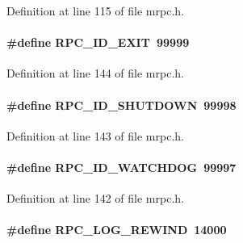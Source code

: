 Definition at line 115 of file mrpc.h.
\paragraph[{RPC\_\-ID\_\-EXIT}]{\setlength{\rightskip}{0pt plus 5cm}\#define RPC\_\-ID\_\-EXIT~99999}\hfill\label{group__mrpcdefineh_ga4fecef60778fda08ca026eaad345eca2}

\begin{DoxyItemize}
\item 
\end{DoxyItemize}

Definition at line 144 of file mrpc.h.
\paragraph[{RPC\_\-ID\_\-SHUTDOWN}]{\setlength{\rightskip}{0pt plus 5cm}\#define RPC\_\-ID\_\-SHUTDOWN~99998}\hfill\label{group__mrpcdefineh_ga758695700ff26f404eec79ecbeab4947}

\begin{DoxyItemize}
\item 
\end{DoxyItemize}

Definition at line 143 of file mrpc.h.
\paragraph[{RPC\_\-ID\_\-WATCHDOG}]{\setlength{\rightskip}{0pt plus 5cm}\#define RPC\_\-ID\_\-WATCHDOG~99997}\hfill\label{group__mrpcdefineh_ga3871ac0ea0fbdba943cb70c7cfad6780}

\begin{DoxyItemize}
\item 
\end{DoxyItemize}

Definition at line 142 of file mrpc.h.
\paragraph[{RPC\_\-LOG\_\-REWIND}]{\setlength{\rightskip}{0pt plus 5cm}\#define RPC\_\-LOG\_\-REWIND~14000}\hfill\label{group__mrpcdefineh_gaaeb6f7b0868c6c7cf033e4da7c3ebf2d}

